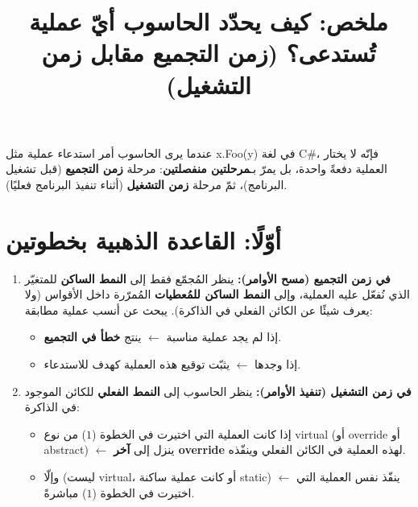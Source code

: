 \documentclass[14pt]{extarticle}
\title{ملخص: كيف يحدّد الحاسوب أيّ عملية تُستدعى؟ (زمن التجميع مقابل زمن التشغيل)}
\begin{document}
\maketitle
\thispagestyle{fancy}

\begin{boxDef}
عندما يرى الحاسوب أمر استدعاء عملية مثل \textenglish{x.Foo(y)} في لغة \textenglish{C\#}، فإنّه لا يختار العملية دفعةً واحدة، بل يمرّ بـ\textbf{مرحلتين منفصلتين}: مرحلة \textbf{زمن التجميع} (قبل تشغيل البرنامج)، ثمّ مرحلة \textbf{زمن التشغيل} (أثناء تنفيذ البرنامج فعليًا).
\end{boxDef}

\section*{أوّلًا: القاعدة الذهبية بخطوتين}

\begin{enumerate}[itemsep=0.8em]
    \item \textbf{في زمن التجميع (مسح الأوامر):} ينظر المُجمّع فقط إلى \textbf{النمط الساكن} للمتغيّر الذي نُفعّل عليه العملية، وإلى \textbf{النمط الساكن للمُعطيات} المُمرّرة داخل الأقواس (ولا يعرف شيئًا عن الكائن الفعلي في الذاكرة). يبحث عن أنسب عملية مطابقة:
    \begin{itemize}
        \item إذا لم يجد عملية مناسبة $\leftarrow$ ينتج \textbf{خطأ في التجميع}.
        \item إذا وجدها $\leftarrow$ يثبّت توقيع هذه العملية كهدف للاستدعاء.
    \end{itemize}
    \filbreak
    \item \textbf{في زمن التشغيل (تنفيذ الأوامر):} ينظر الحاسوب إلى \textbf{النمط الفعلي} للكائن الموجود في الذاكرة:
    \begin{itemize}
        \item إذا كانت العملية التي اختيرت في الخطوة ($1$) من نوع \textenglish{virtual} (أو \textenglish{override} أو \textenglish{abstract}) $\leftarrow$ ينزل إلى \textbf{آخر \textenglish{override}} لهذه العملية في الكائن الفعلي وينفّذه.
        \item وإلّا (ليست \textenglish{virtual}، أو كانت عملية ساكنة \textenglish{static}) $\leftarrow$ ينفّذ نفس العملية التي اختيرت في الخطوة ($1$) مباشرةً.
    \end{itemize}
    \filbreak
\end{enumerate}
\end{document}
